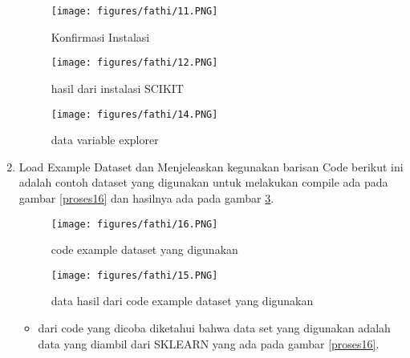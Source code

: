 \begin{enumerate}
\begin{figure}
\centerline{\texttt{[image: figures/fathi/11.PNG]}}
\caption{Konfirmasi Instalasi}
\label{proses11}
\end{figure}
\begin{figure}
\centerline{\texttt{[image: figures/fathi/12.PNG]}}
\caption{hasil dari instalasi SCIKIT}
\label{proses12}
\centerline{\texttt{[image: figures/fathi/14.PNG]}}
\caption{data variable explorer}
\label{proses14}
\end{figure}

\item
Load Example Dataset dan Menjeleaskan kegunakan barisan Code
\subitem
berikut ini adalah contoh dataset yang digunakan untuk melakukan compile ada pada gambar \ref{proses16} dan hasilnya ada pada gambar \ref{proses15}.

\begin{figure}
\centerline{\texttt{[image: figures/fathi/16.PNG]}}
\caption{code example dataset yang digunakan}
\label{proses16}

\centerline{\texttt{[image: figures/fathi/15.PNG]}}
\caption{data hasil dari code example dataset yang digunakan}
\label{proses15}
\end{figure}
\begin{itemize}
\item
dari code yang dicoba diketahui bahwa data set yang digunakan adalah data yang diambil dari SKLEARN yang ada pada gambar \ref{proses16}.
\end{itemize}
\end{enumerate}
